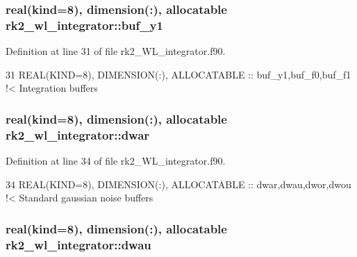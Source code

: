 \subsubsection[{\texorpdfstring{buf\+\_\+y1}{buf_y1}}]{\setlength{\rightskip}{0pt plus 5cm}real(kind=8), dimension(\+:), allocatable rk2\+\_\+wl\+\_\+integrator\+::buf\+\_\+y1\hspace{0.3cm}{\ttfamily [private]}}\hypertarget{namespacerk2__wl__integrator_aa99c24f0aa8ae7eacd3d5123ea70db7b}{}\label{namespacerk2__wl__integrator_aa99c24f0aa8ae7eacd3d5123ea70db7b}


Definition at line 31 of file rk2\+\_\+\+W\+L\+\_\+integrator.\+f90.


\begin{DoxyCode}
31   \textcolor{keywordtype}{REAL(KIND=8)}, \textcolor{keywordtype}{DIMENSION(:)}, \textcolor{keywordtype}{ALLOCATABLE} :: buf\_y1,buf\_f0,buf\_f1\textcolor{comment}{ !< Integration buffers}
\end{DoxyCode}
\subsubsection[{\texorpdfstring{dwar}{dwar}}]{\setlength{\rightskip}{0pt plus 5cm}real(kind=8), dimension(\+:), allocatable rk2\+\_\+wl\+\_\+integrator\+::dwar\hspace{0.3cm}{\ttfamily [private]}}\hypertarget{namespacerk2__wl__integrator_a44cee4402f05ef3465bf87baf91951e8}{}\label{namespacerk2__wl__integrator_a44cee4402f05ef3465bf87baf91951e8}


Definition at line 34 of file rk2\+\_\+\+W\+L\+\_\+integrator.\+f90.


\begin{DoxyCode}
34   \textcolor{keywordtype}{REAL(KIND=8)}, \textcolor{keywordtype}{DIMENSION(:)}, \textcolor{keywordtype}{ALLOCATABLE} :: dwar,dwau,dwor,dwou\textcolor{comment}{  !< Standard gaussian noise buffers}
\end{DoxyCode}
\subsubsection[{\texorpdfstring{dwau}{dwau}}]{\setlength{\rightskip}{0pt plus 5cm}real(kind=8), dimension(\+:), allocatable rk2\+\_\+wl\+\_\+integrator\+::dwau\hspace{0.3cm}{\ttfamily [private]}}\hypertarget{namespacerk2__wl__integrator_afa336c0cb10e6befa1ccc44522e2f517}{}\label{namespacerk2__wl__integrator_afa336c0cb10e6befa1ccc44522e2f517}


